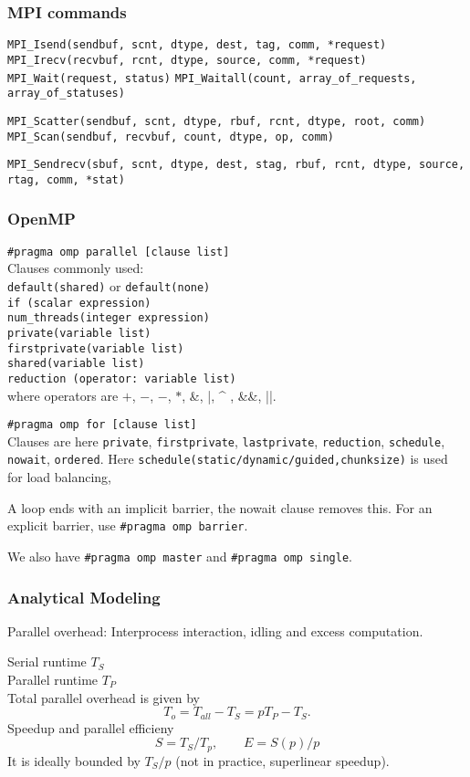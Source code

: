 \documentclass[a4paper,10pt,twoside,twocolumn]{article}
\renewcommand{\(}{\left(}
\renewcommand{\)}{\right)}
\newcommand{\header}[1]{\subsubsection*{#1} \vspace{-0.2cm}}
\begin{document}
\header{MPI commands}
\verb+MPI_Isend(sendbuf, scnt, dtype, dest, tag, comm, *request)+
\verb+MPI_Irecv(recvbuf, rcnt, dtype, source, comm, *request)+ 
\verb+MPI_Wait(request, status)+
\verb+MPI_Waitall(count, array_of_requests, array_of_statuses)+

\verb+MPI_Scatter(sendbuf, scnt, dtype, rbuf, rcnt, dtype, root, comm)+
\verb+MPI_Scan(sendbuf, recvbuf, count, dtype, op, comm)+

\verb+MPI_Sendrecv(sbuf, scnt, dtype, dest, stag, rbuf, rcnt, dtype, source, rtag, comm, *stat)+
                
\header{OpenMP}
\verb+#pragma omp parallel [clause list]+ \\
Clauses commonly used: \\
\verb+default(shared)+ or 
\verb+default(none)+ \\
\verb+if (scalar expression)+ \\
\verb+num_threads(integer expression)+ \\
\verb+private(variable list)+ \\
\verb+firstprivate(variable list)+ \\
\verb+shared(variable list)+ \\
\verb+reduction (operator: variable list)+  \\
where operators are $+$, $-$, $-$, $*$, \&, |,  \^{} , \&\&, ||.

\verb+#pragma omp for [clause list]+ \\
Clauses are here \verb+private+, \verb+firstprivate+, \verb+lastprivate+, \verb+reduction+, \verb+schedule+, \verb+nowait+, \verb+ordered+. Here \verb+schedule(static/dynamic/guided,chunksize)+ is used for load balancing, 

A loop ends with an implicit barrier, the nowait clause removes this. For an explicit barrier, use \verb+#pragma omp barrier+.

We also have \verb+#pragma omp master+ and \verb+#pragma omp single+.

\clearpage

\header{Analytical Modeling}
Parallel overhead: Interprocess interaction, idling and excess computation.

Serial runtime $T_S$ \\
Parallel runtime $T_P$ \\
Total parallel overhead is given by
$$T_o = T_{all} - T_S = pT_P - T_S.$$
Speedup and parallel efficieny
$$S = T_S / T_p, \qquad E=S(p)/p$$
It is ideally bounded by $T_S/p$ (not in practice, superlinear speedup).
\end{document}
